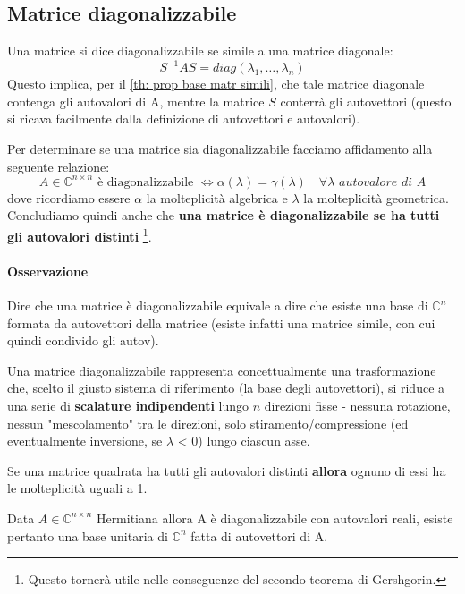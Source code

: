 \documentclass[12pt,a4paper,]{report}
\begin{document}
\subsection{Matrice diagonalizzabile}
\begin{definizione}
    Una matrice si dice diagonalizzabile se simile a una matrice diagonale:
    \[
    S^{-1}AS = diag(\lambda_1, \dots, \lambda_n)
    \]
    Questo implica, per il \autoref{th: prop base matr simili}, che tale matrice diagonale contenga gli autovalori di A, mentre la matrice $S$ conterrà gli autovettori (questo si ricava facilmente dalla definizione di autovettori e autovalori).\\
\end{definizione}
\begin{teorema}
    Per determinare se una matrice sia diagonalizzabile facciamo affidamento alla seguente relazione:
    \[
    A \in \mathbb{C}^{n\times n} \text{ è diagonalizzabile } \Longleftrightarrow \alpha(\lambda) = \gamma(\lambda) \quad \forall \lambda \textit{ autovalore di }A
    \]
    dove ricordiamo essere $\alpha$ la molteplicità algebrica e $\lambda$ la molteplicità geometrica.\\
    Concludiamo quindi anche che \textbf{una matrice è diagonalizzabile se ha tutti gli autovalori distinti}
    \footnote{Questo tornerà utile nelle conseguenze del secondo teorema di Gershgorin.}.
\end{teorema}
\paragraph{Osservazione}
Dire che una matrice è diagonalizzabile equivale a dire che esiste una base di $\mathbb{C}^n$ formata da autovettori della matrice (esiste infatti una matrice simile, con cui quindi condivido gli autov).
\begin{nota}
    Una matrice diagonalizzabile rappresenta concettualmente una trasformazione che, scelto il giusto sistema di riferimento (la base degli autovettori), si riduce a una serie di \textbf{scalature indipendenti} lungo $n$ direzioni fisse - nessuna rotazione, nessun "mescolamento" tra le direzioni, solo stiramento/compressione (ed eventualmente inversione, se $\lambda$ < 0) lungo ciascun asse.
\end{nota}
\begin{nota}
    Se una matrice quadrata ha tutti gli autovalori distinti \textbf{allora} ognuno di essi ha le molteplicità uguali a 1.
\end{nota}
\begin{teorema}
    \label{th: teorema spettrale}
    Data $A\in \mathbb{C}^{n\times n}$ Hermitiana allora A è diagonalizzabile con autovalori reali, esiste pertanto una base unitaria di $\mathbb{C}^n$ fatta di autovettori di A.
\end{teorema}
\end{document}
